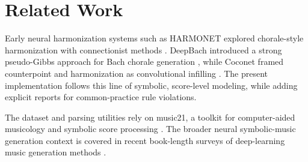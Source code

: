\section{Related Work}

Early neural harmonization systems such as HARMONET explored chorale-style harmonization with connectionist methods \cite{hild1992harmonet}. DeepBach introduced a strong pseudo-Gibbs approach for Bach chorale generation \cite{hadjeres2017deepbach}, while Coconet framed counterpoint and harmonization as convolutional infilling \cite{huang2017coconet}. The present implementation follows this line of symbolic, score-level modeling, while adding explicit reports for common-practice rule violations.

The dataset and parsing utilities rely on music21, a toolkit for computer-aided musicology and symbolic score processing \cite{cuthbert2010music21}. The broader neural symbolic-music generation context is covered in recent book-length surveys of deep-learning music generation methods \cite{briot2020deep}.
